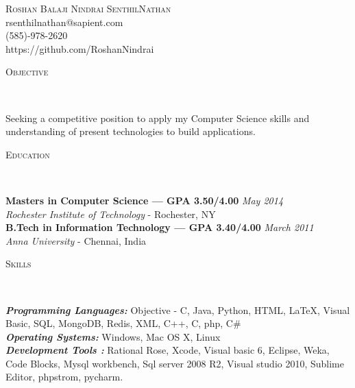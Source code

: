 \documentclass[9pt]{article}
\newenvironment{changemargin}[2]{%
  \begin{list}{}{%
    \setlength{\topsep}{0pt}%
    \setlength{\leftmargin}{#1}%
    \setlength{\rightmargin}{#2}%
    \setlength{\listparindent}{\parindent}%
    \setlength{\itemindent}{\parindent}%
    \setlength{\parsep}{\parskip}%
  }%
  \item[]}{\end{list}
}
\newcommand{\lineover}{
	\begin{changemargin}{-0.05in}{-0.05in}
		\vspace*{-8pt}
		\hrulefill \\
		\vspace*{-2pt}
	\end{changemargin}
}
\newcommand{\header}[1]{
	\begin{changemargin}{-0.5in}{-0.5in}
		\scshape{#1}\\
  	\lineover
	\end{changemargin}
}
\newcommand{\contact}[4]{
	\begin{changemargin}{-0.5in}{-0.5in}
		\begin{center}
			{\Large \scshape {#1}}\\ \smallskip
			{#2}\\ \smallskip 
			{#3}\\ \smallskip
			{#4}\smallskip
		\end{center}
	\end{changemargin}
}
\newenvironment{body} {
	\vspace*{-16pt}
	\begin{changemargin}{-0.25in}{-0.5in}
  }	
	{\end{changemargin}
}
\begin{document}
\contact{Roshan Balaji Nindrai SenthilNathan}{rsenthilnathan@sapient.com}{(585)-978-2620}{https://github.com/RoshanNindrai}


\header{Objective}

\begin{body}
	\vspace{14pt}
	Seeking a competitive position to apply my Computer Science skills and understanding of present technologies to build applications.
\end{body}

\smallskip


\header{Education}

\begin{body}
	\vspace{14pt}
	\textbf{Masters in Computer Science\hspace{23pt} --- GPA 3.50/4.00}{} \hfill \emph{May 2014}{} \\
	\emph{Rochester Institute of Technology} - Rochester, NY{} \\
  \medskip
	\textbf{B.Tech in Information Technology --- GPA 3.40/4.00} \hfill \emph{March 2011} \\
	\emph{Anna University} - Chennai, India\\
\end{body}

\smallskip

\header{Skills}

\begin{body}
	\vspace{14pt}
	\emph{\textbf{Programming Languages:}}{} Objective - C,  Java, Python, HTML,  \LaTeX, Visual Basic, SQL, MongoDB, Redis, XML, C++, C, php,  C\#\\
	\medskip
	\emph{\textbf{Operating Systems:}}{} Windows, Mac OS X, Linux\\
\medskip
\emph{\textbf{Development Tools :}}{} Rational Rose, Xcode, Visual basic 6, Eclipse, Weka, Code Blocks, Mysql workbench, Sql server 2008 R2, Visual studio 2010, Sublime Editor, phpstrom, pycharm.\\
\end{body}

\smallskip
\end{document}
